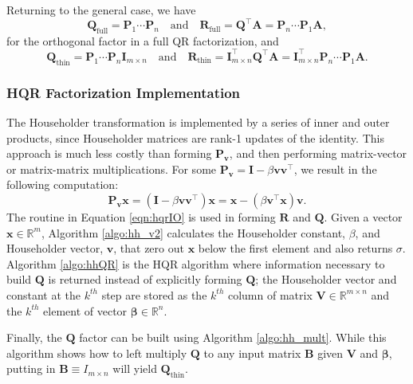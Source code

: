 \documentclass[review,onefignum,onetabnum]{siamart190516}
\newcommand{\R}{\mathbb{R}}
\newcommand{\bb}[1]{\mathbf{#1}}
\begin{document}
Returning to the general case, we have
\begin{equation}
\bb{Q}_{\text{full}} = \bb{P}_1 \cdots \bb{P}_n\quad \text{and} \quad \bb{R}_{\text{full}} = \bb{Q}^{\top}\bb{A} = \bb{P}_n\cdots \bb{P}_1\bb{A},
\end{equation}
for the orthogonal factor in a full QR factorization, and
\begin{equation}
\bb{Q}_{\text{thin}} = \bb{P}_1 \cdots \bb{P}_n\bb{I}_{m\times n}\quad \text{and} \quad \bb{R}_{\text{thin}} = \bb{I}_{m\times n}^{\top}\bb{Q}^{\top}\bb{A} = \bb{I}_{m\times n}^{\top}\bb{P}_n\cdots \bb{P}_1\bb{A}.
\end{equation}

\subsubsection{HQR Factorization Implementation}
\label{sssec:HQRfI}
The Householder transformation is implemented by a series of inner and outer products, since Householder matrices are rank-1 updates of the identity. 
This approach is much less costly than forming $\bb{P}_{\bb{v}}$, and then performing matrix-vector or matrix-matrix multiplications.
For some $\bb{P}_{\bb{v}}=\bb{I}-\beta \bb{v}\bb{v}^{\top}$, we result in the following computation:
\begin{equation}
\label{eqn:hqrIO}
\bb{P}_{\bb{v}} \bb{x} = (\bb{I}-\beta \bb{v}\bb{v}^{\top})\bb{x} = \bb{x} - (\beta \bb{v}^{\top}\bb{x})\bb{v}.
\end{equation}
The routine in Equation \ref{eqn:hqrIO} is used in forming $\bb{R}$  and $\bb{Q}$. 
Given a vector $\bb{x}\in\R^{m}$, Algorithm \ref{algo:hh_v2} calculates the Householder constant, $\beta$, and Householder vector, $\bb{v}$, that zero out $\bb{x}$ below the first element and also returns $\sigma$. 
Algorithm \ref{algo:hhQR} is the HQR algorithm where information necessary to build $\bb{Q}$ is returned instead of explicitly forming $\bb{Q}$; the Householder vector and constant at the $k^{th}$ step are stored as the $k^{th}$ column of matrix $\bb{V}\in\R^{m\times n}$ and the $k^{th}$ element of vector $\bm{\beta}\in\R^n$. 

Finally, the $\bb{Q}$ factor can be built using Algorithm \ref{algo:hh_mult}.
While this algorithm shows how to left multiply $\bb{Q}$ to any input matrix $\bb{B}$ given $\bb{V}$ and $\bm{\beta}$, putting in $\bb{B}\equiv I_{m\times n}$ will yield $\bb{Q}_{\text{thin}}$.
\end{document}
